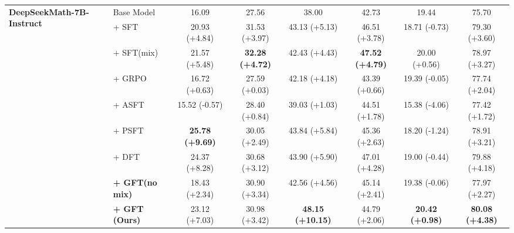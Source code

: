 \begin{table}[!t]
{\begin{tabular}{llcccccc}
            \multirow{9}{*}{\textbf{DeepSeekMath-7B-Instruct}} 
            & Base Model & 16.09 & 27.56 & 38.00 & 42.73 & 19.44 & 75.70 \\
            & + SFT & 20.93 (+4.84) & 31.53 (+3.97) & 43.13 (+5.13) & 46.51 (+3.78) & 18.71 (-0.73) & 79.30 (+3.60) \\
            & + SFT(mix) & 21.57 (+5.48) & \cellcolor{blue!10}\textbf{32.28 (+4.72)} & 42.43 (+4.43) & \cellcolor{blue!10}\textbf{47.52 (+4.79)} & 20.00 (+0.56) & 78.97 (+3.27) \\
            & + GRPO & 16.72 (+0.63) & 27.59 (+0.03) & 42.18 (+4.18) & 43.39 (+0.66) & 19.39 (-0.05) & 77.74 (+2.04) \\
            & + ASFT & 15.52 (-0.57) & 28.40 (+0.84) & 39.03 (+1.03) & 44.51 (+1.78) & 15.38 (-4.06) & 77.42 (+1.72) \\
            & + PSFT & \cellcolor{blue!10}\textbf{25.78 (+9.69)} & 30.05 (+2.49) & 43.84 (+5.84) & 45.36 (+2.63) & 18.20 (-1.24) & 78.91 (+3.21) \\
            & + DFT & 24.37 (+8.28) & 30.68 (+3.12) & 43.90 (+5.90) & 47.01 (+4.28) & 19.00 (-0.44) & 79.88 (+4.18) \\
            \cmidrule(l){2-8}
            & \textbf{+ GFT(no mix)} & 18.43 (+2.34) & 30.90 (+3.34) & 42.56 (+4.56) & 45.14 (+2.41) & 19.38 (-0.06) & 77.97 (+2.27) \\
            & \textbf{+ GFT (Ours)} & 23.12 (+7.03) & 30.98 (+3.42) & \cellcolor{blue!10}\textbf{48.15 (+10.15)} & 44.79 (+2.06) & \cellcolor{blue!10}\textbf{20.42 (+0.98)} & \cellcolor{blue!10}\textbf{80.08 (+4.38)} \\
            \midrule
              

\end{tabular}}
\end{table}
